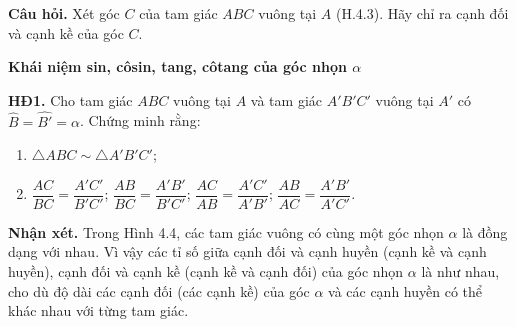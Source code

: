 \begin{lesson}
    \textbf{Câu hỏi.} Xét góc $C$ của tam giác $ABC$ vuông tại $A$ (H.4.3). Hãy chỉ ra cạnh đối và cạnh kề của góc $C$.

    \begin{center}
    \end{center}

    \answerline

    \textbf{Khái niệm sin, côsin, tang, côtang của góc nhọn $\alpha$}

    \textbf{HĐ1.} Cho tam giác $ABC$ vuông tại $A$ và tam giác $A'B'C'$ vuông tại $A'$ có $\widehat B=\widehat{B'}=\alpha$. Chứng minh rằng:
    \begin{enumerate}[label=\alph*)]
        \item $\triangle ABC\sim\triangle A'B'C'$;
        \item $\dfrac{AC}{BC}=\dfrac{A'C'}{B'C'}$; $\dfrac{AB}{BC}=\dfrac{A'B'}{B'C'}$; $\dfrac{AC}{AB}=\dfrac{A'C'}{A'B'}$; $\dfrac{AB}{AC}=\dfrac{A'B'}{A'C'}$.
    \end{enumerate}

    \answerline
    \answerline

    \textbf{Nhận xét.} Trong Hình 4.4, các tam giác vuông có cùng một góc nhọn $\alpha$ là đồng dạng với nhau. Vì vậy các tỉ số giữa cạnh đối và cạnh huyền (cạnh kề và cạnh huyền), cạnh đối và cạnh kề (cạnh kề và cạnh đối) của góc nhọn $\alpha$ là như nhau, cho dù độ dài các cạnh đối (các cạnh kề) của góc $\alpha$ và các cạnh huyền có thể khác nhau với từng tam giác.

    \begin{center}
    \end{center}


\end{lesson}
